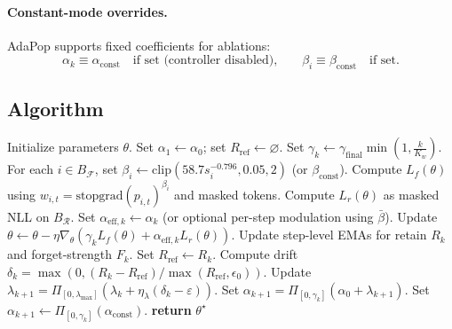 \paragraph{Constant-mode overrides.}  
AdaPop supports fixed coefficients for ablations:
\[
\alpha_k \equiv \alpha_{\mathrm{const}} \quad \text{if set (controller disabled),}
\qquad
\beta_i \equiv \beta_{\mathrm{const}} \quad \text{if set.}
\]

\subsection{Algorithm}

\begin{algorithm}[H]
\caption{\textbf{AdaPop}}
\begin{algorithmic}[1]
\STATE Initialize parameters $\theta$.
\STATE Set $\alpha_1 \leftarrow \alpha_0$; set $R_{\mathrm{ref}} \leftarrow \varnothing$.
  \STATE Set $\gamma_k \leftarrow \gamma_{\mathrm{final}} \min\left(1, \frac{k}{K_w}\right)$.
    \STATE For each $i \in B_{\mathcal{F}}$, set $\beta_i \leftarrow \mathrm{clip}(58.7 s_i^{-0.796}, 0.05, 2)$ (or $\beta_{\mathrm{const}}$).
    \STATE Compute $L_f(\theta)$ using $w_{i,t} = \mathrm{stopgrad}(p_{i,t})^{\beta_i}$ and masked tokens.
    \STATE Compute $L_r(\theta)$ as masked NLL on $B_{\mathcal{R}}$.
    \STATE Set $\alpha_{\mathrm{eff},k} \leftarrow \alpha_k$ (or optional per-step modulation using $\bar{\beta}$).
    \STATE Update $\theta \leftarrow \theta - \eta \nabla_\theta (\gamma_k L_f(\theta) + \alpha_{\mathrm{eff},k} L_r(\theta))$.
    \STATE Update step-level EMAs for retain $R_k$ and forget-strength $F_k$.
  \ENDFOR
    \STATE Set $R_{\mathrm{ref}} \leftarrow R_k$.
  \ENDIF
  \STATE Compute drift $\delta_k = \max(0, (R_k - R_{\mathrm{ref}}) / \max(R_{\mathrm{ref}}, \epsilon_0))$.
    \STATE Update $\lambda_{k+1} = \Pi_{[0, \lambda_{\max}]}\left( \lambda_k + \eta_\lambda (\delta_k - \varepsilon) \right)$.
    \STATE Set $\alpha_{k+1} = \Pi_{[0, \gamma_k]} (\alpha_0 + \lambda_{k+1})$.
  \ELSE
    \STATE Set $\alpha_{k+1} \leftarrow \Pi_{[0, \gamma_k]} (\alpha_{\mathrm{const}})$.
  \ENDIF
\ENDFOR
\STATE \textbf{return} $\theta^\star$
\end{algorithmic}
\end{algorithm}